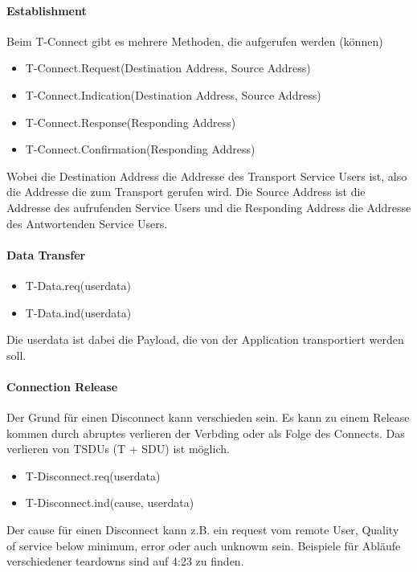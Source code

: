 			\paragraph{Establishment}
				Beim T-Connect gibt es mehrere Methoden, die aufgerufen werden (können)
				\begin{itemize}
					\item T-Connect.Request(Destination Address, Source Address)
					\item T-Connect.Indication(Destination Address, Source Address)
					\item T-Connect.Response(Responding Address)
					\item T-Connect.Confirmation(Responding Address)
				\end{itemize}
				Wobei die Destination Address die Addresse des Transport Service Users ist, also die Addresse die zum Transport gerufen wird. Die Source Address ist die Addresse des aufrufenden Service Users und die Responding Address die Addresse des Antwortenden Service Users. 

			\paragraph{Data Transfer}
				\begin{itemize}
					\item T-Data.req(userdata)
					\item T-Data.ind(userdata)
				\end{itemize}
				Die userdata ist dabei die Payload, die von der Application transportiert werden soll. 

			\paragraph{Connection Release}
				Der Grund für einen Disconnect kann verschieden sein. Es kann zu einem Release kommen durch abruptes verlieren der Verbding oder als Folge des Connects. Das verlieren von TSDUs (T + SDU) ist möglich.
				\begin{itemize}
					\item T-Disconnect.req(userdata)
					\item T-Disconnect.ind(cause, userdata)
				\end{itemize}
				Der cause für einen Disconnect kann z.B. ein request vom remote User, Quality of service below minimum, error oder auch unknowm sein. Beispiele für Abläufe verschiedener teardowns sind auf 4:23 zu finden. 

